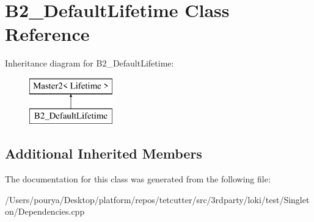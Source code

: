\hypertarget{classB2__DefaultLifetime}{}\section{B2\+\_\+\+Default\+Lifetime Class Reference}
\label{classB2__DefaultLifetime}
Inheritance diagram for B2\+\_\+\+Default\+Lifetime\+:\begin{figure}[H]
\begin{center}
\leavevmode
\includegraphics[height=2.000000cm]{classB2__DefaultLifetime}
\end{center}
\end{figure}
\subsection*{Additional Inherited Members}


The documentation for this class was generated from the following file\+:\begin{DoxyCompactItemize}
\item 
/\+Users/pourya/\+Desktop/platform/repos/tetcutter/src/3rdparty/loki/test/\+Singleton/Dependencies.\+cpp\end{DoxyCompactItemize}
